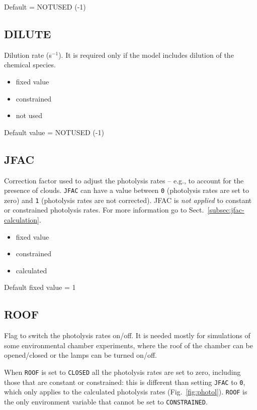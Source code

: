 Default = NOTUSED (-1)

\subsection{DILUTE} \label{subsec:dilute}

Dilution rate (s$^{-1}$). It is required only if the model includes
dilution of the chemical species. %

\begin{itemize}
\item fixed value
\item constrained
\item not used
\end{itemize}

Default value = NOTUSED (-1)

\subsection{JFAC} \label{subsec:jfac}

Correction factor used to adjust the photolysis rates -- e.g., to
account for the presence of clouds. \texttt{JFAC} can have a value
between \texttt{0} (photolysis rates are set to zero) and \texttt{1}
(photolysis rates are not corrected). JFAC is \emph{not applied} to
constant or constrained photolysis rates. For more information go to
Sect.~\ref{subsec:jfac-calculation}.

\begin{itemize}
\item fixed value
\item constrained
\item calculated
\end{itemize}

Default fixed value = 1

\subsection{ROOF} \label{subsec:roof}

Flag to switch the photolysis rates on/off. It is needed mostly for simulations
of some environmental chamber experiments, where the roof of the chamber
can be opened/closed or the lamps can be turned on/off.

When \texttt{ROOF} is set to \texttt{CLOSED} all the photolysis rates
are set to zero, including those that are constant or constrained:
this is different than setting \texttt{JFAC} to \texttt{0}, which only
applies to the calculated photolysis rates (Fig.~\ref{fig:photol}).
\texttt{ROOF} is the only environment variable that cannot be set to
\texttt{CONSTRAINED}.

